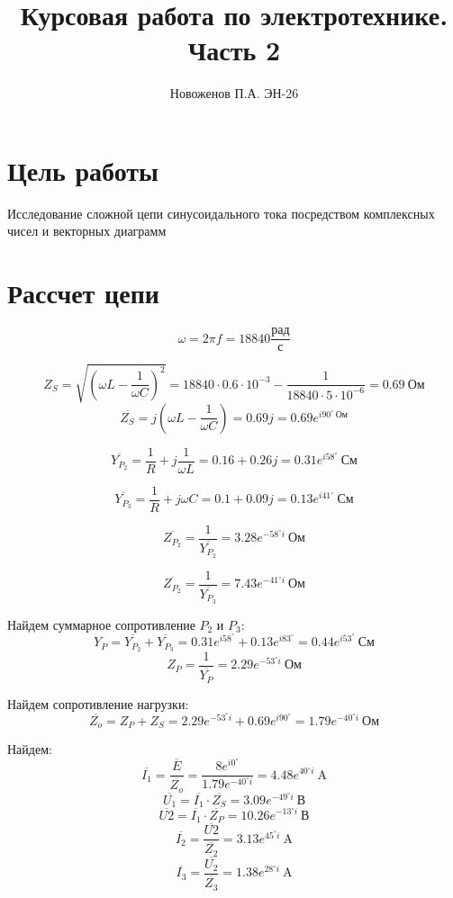 \documentclass[14pt, a4paper]{article}
\title{Курсовая работа по электротехнике. Часть 2}
\author{Новоженов П.А. ЭН-26}
\date{}
\begin{document}
    \maketitle

    \newpage

    \section*{Цель работы}
        Исследование сложной цепи синусоидального тока посредством комплексных
        чисел и векторных диаграмм

    \section*{Рассчет цепи}

    $$\omega = 2\pi f = 18840 \frac{\text{рад}}{\text{с}}$$


    $$Z_S = \sqrt{(\omega L - \frac{1}{\omega C})^2} = 18840 \cdot 0.6 \cdot 10^{-3} - \frac{1}{18840 \cdot 5 \cdot 10^{-6}} = 0.69 \ \text{Ом}$$
    $$\overline{Z_S} = j(\omega L - \frac{1}{\omega C}) = 0.69j = 0.69e^{i90^\circ \ \text{Ом}}$$

    $$\overline{Y_{P_2}} = \frac{1}{R} + j\frac{1}{\omega L} = 0.16 + 0.26j = 0.31e^{i58^\circ}\ \text{См}$$

    $$\overline{Y_{P_3}} = \frac{1}{R} + j\omega C = 0.1 + 0.09j = 0.13e^{i41^\circ}\ \text{См}$$

    $$\overline{Z_{P_2}} = \frac{1}{\overline{Y_{P_2}}} = 3.28e^{-58^\circ i} \ \text{Ом}$$

    $$\overline{Z_{P_2}} = \frac{1}{\overline{Y_{P_3}}} = 7.43e^{-41^\circ i} \ \text{Ом}$$

    Найдем суммарное сопротивление $P_2$ и $P_3$:
    $$Y_P = \overline{Y_{P_2}} + \overline{Y_{P_3}} = 0.31e^{i58^\circ} + 0.13e^{i83^\circ} = 0.44 e^{i53^\circ}\ \text{См}$$
    $$Z_P = \frac{1}{\overline{Y_P}} = 2.29 e^{-53^\circ i} \ \text{Ом}$$

    Найдем сопротивление нагрузки:
    $$\overline{Z_o} = Z_P + Z_S = 2.29e^{-53^\circ i} + 0.69e^{i90^\circ} = 1.79 e^{-40^\circ i} \ \text{Ом}$$

    Найдем:
    $$\overline{I_1} = \frac{\overline{E}}{\overline{Z_o}} = \frac{8e^{i0^\circ}}{1.79 e^{-40^\circ i}} = 4.48 e^{40^\circ i} \ \text{A}$$
    $$\overline{U_1} = \overline{I_1} \cdot \overline{Z_S} = 3.09 e^{-49^\circ i} \ \text{В}$$
    $$\overline{U2} = \overline{I_1} \cdot \overline{Z_P} = 10.26 e^{-13^\circ i} \ \text{В}$$
    $$\overline{I_2} = \frac{\overline{U2}}{\overline{Z_2}} = 3.13 e^{45^\circ i} \ \text{A}$$
    $$\overline{I_3} = \frac{\overline{U_2}}{\overline{Z_3}} = 1.38 e^{28^\circ i} \ \text{A}$$
\end{document}
